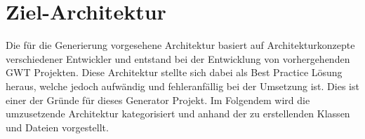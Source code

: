 \section{Ziel-Architektur}\label{AufBZielArchitektur}
Die für die Generierung vorgesehene Architektur basiert auf 
Architekturkonzepte verschiedener Entwickler und entstand bei der Entwicklung
von vorhergehenden GWT Projekten. Diese Architektur stellte sich dabei als
\glqq{}Best Practice\grqq{} Lösung heraus, welche jedoch aufwändig und
fehleranfällig bei der Umsetzung ist. Dies ist einer der Gründe für dieses Generator Projekt.
Im Folgendem wird die umzusetzende Architektur kategorisiert und anhand der zu
erstellenden Klassen und Dateien vorgestellt.\\
